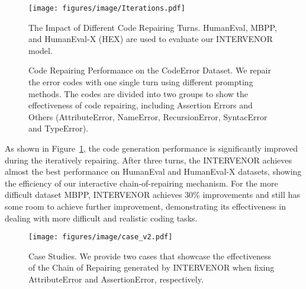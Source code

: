 \documentclass[11pt]{article}
\begin{document}
\begin{figure}[t] \centering
    \texttt{[image: figures/image/Iterations.pdf]}
    \caption{The Impact of Different Code Repairing Turns. HumanEval, MBPP, and HumanEval-X (HEX) are used to evaluate our INTERVENOR model.} \label{fig:iterations}
\end{figure} 





\begin{figure}[t]
    \centering
    \caption{Code Repairing Performance on the CodeError Dataset. We repair the error codes with one single turn using different prompting methods. The codes are divided into two groups to show the effectiveness of code repairing, including Assertion Errors and Others (AttributeError, NameError, RecursionError, SyntacError and TypeError).}
    \label{fig:error_analysis}
\end{figure} As shown in Figure~\ref{fig:iterations}, the code generation performance is significantly improved during the iteratively repairing. After three turns, the INTERVENOR achieves almost the best performance on HumanEval and HumanEval-X datasets, showing the efficiency of our interactive chain-of-repairing mechanism. For the more difficult dataset MBPP, INTERVENOR achieves 30\% improvements and still has some room to achieve further improvement, demonstrating its effectiveness in dealing with more difficult and realistic coding tasks.


\begin{figure*}[h] \centering
    \texttt{[image: figures/image/case\_v2.pdf]}
    \caption{Case Studies. We provide two cases that showcase the effectiveness of the Chain of Repairing generated by INTERVENOR when fixing AttributeError and AssertionError, respectively.} \label{fig:case}
\end{figure*}
 
\end{document}
